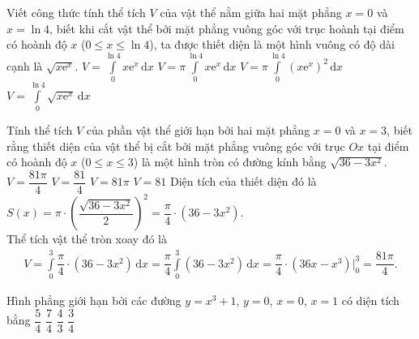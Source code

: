 \begin{ex}%
	Viết công thức tính thể tích $V$ của vật thể nằm giữa hai mặt phẳng $x=0$ và $x=\ln 4$, biết khi cắt vật thể bởi mặt phẳng vuông góc với trục hoành tại điểm có hoành độ $x$ ($0\le x\le \ln 4$), ta được thiết diện là một hình vuông có độ dài cạnh là $\sqrt{x\mathrm{e}^x}$.
	\choice
	{\True $V=\displaystyle\int\limits_0^{\ln 4}x\mathrm{e}^x\mathrm{\,d}x$}
	{$V=\pi\displaystyle\int\limits_0^{\ln 4}x\mathrm{e}^x\mathrm{\,d}x$}
	{$V=\pi\displaystyle\int\limits_0^{\ln 4}\left(x\mathrm{e}^x\right)^2\mathrm{\,d}x$}
	{$V=\displaystyle\int\limits_0^{\ln 4}\sqrt{x\mathrm{e}^x}\mathrm{\,d}x$}
\end{ex}
\begin{ex}%
	Tính thể tích $V$ của phần vật thể giới hạn bởi hai mặt phẳng $x=0$ và $x=3$, biết rằng thiết diện của vật thể bị cắt bởi mặt phẳng vuông góc với trục $Ox$ tại điểm có hoành độ $x$ ($0\leq x \leq 3$) là một hình tròn có đường kính bằng $\sqrt{36-3x^2}$.
	\choice
	{\True $V=\dfrac{81\pi}{4}$}
	{$V=\dfrac{81}{4}$}
	{$V=81\pi$}
	{$V=81$}
	\loigiai
	{
	Diện tích của thiết diện đó là $S(x)=\pi\cdot \left(\dfrac{\sqrt{36-3x^2}}{2}\right)^2 = \dfrac{\pi}{4}\cdot(36-3x^2)$.\\
	Thể tích vật thể tròn xoay đó là
	\begin{eqnarray*}
	V=\displaystyle\int\limits_0^3\dfrac{\pi}{4}\cdot(36-3x^2)\mathrm{\,d}x = \dfrac{\pi}{4} \displaystyle\int\limits_0^3(36-3x^2)\mathrm{\,d}x = \dfrac{\pi}{4}\cdot(36x-x^3)\bigg|_0^3 = \dfrac{81\pi}{4}.
	\end{eqnarray*}
	}
\end{ex}
\begin{ex}%
	Hình phẳng giới hạn bởi các đường $y=x^3+1$, $y=0$, $x=0$, $x=1$ có diện tích bằng
	\choice
	{\True $\dfrac{5}{4}$}
	{$\dfrac{7}{4}$}
	{$\dfrac{4}{3}$}
	{$\dfrac{3}{4}$}
\end{ex}
